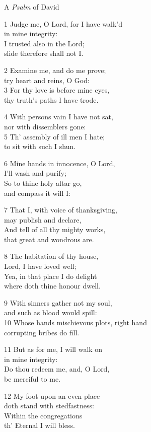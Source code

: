 \begin{multicols}{3}
A \emph{Psalm} of David

1 Judge me, O Lord, for I have walk’d\\
in mine integrity:\\
I trusted also in the Lord;\\
slide therefore shall not I.

2 Examine me, and do me prove;\\
try heart and reins, O God:\\
3 For thy love is before mine eyes,\\
thy truth’s paths I have trode.

4 With persons vain I have not sat,\\
nor with dissemblers gone:\\
5 Th’ assembly of ill men I hate;\\
to sit with such I shun.

6 Mine hands in innocence, O Lord,\\
I’ll wash and purify;\\
So to thine holy altar go,\\
and compass it will I:

7 That I, with voice of thanksgiving,\\
may publish and declare,\\
And tell of all thy mighty works,\\
that great and wondrous are.

8 The habitation of thy house,\\
Lord, I have loved well;\\
Yea, in that place I do delight\\
where doth thine honour dwell.

9 With sinners gather not my soul,\\
and such as blood would spill:\\
10 Whose hands mischievous plots, right hand\\
corrupting bribes do fill.

11 But as for me, I will walk on\\
in mine integrity:\\
Do thou redeem me, and, O Lord,\\
be merciful to me.

12 My foot upon an even place\\
doth stand with stedfastness:\\
Within the congregations\\
th’ Eternal I will bless.


\end{multicols}
